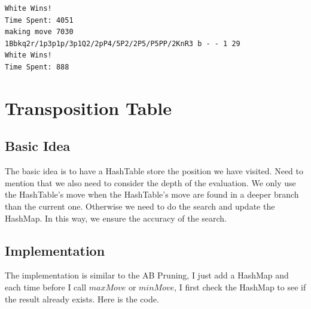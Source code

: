 \documentclass{article}
\begin{document}
\begin{lstlisting}
White Wins!
Time Spent: 4051
making move 7030
1Bbkq2r/1p3p1p/3p1Q2/2pP4/5P2/2P5/P5PP/2KnR3 b - - 1 29
White Wins!
Time Spent: 888
\end{lstlisting}

\clearpage
\section{Transposition Table}
\subsection{Basic Idea}
The basic idea is to have a HashTable store the position we have visited. Need to mention that we also need to consider the depth of the evaluation. We only use the HashTable's move when the HashTable's move are found in a deeper branch than the current one. Otherwise we need to do the search and update the HashMap. In this way, we ensure the accuracy of the search.

\subsection{Implementation}
The implementation is similar to the AB Pruning, I just add a HashMap and each time before I call $maxMove$ or $minMove$, I first check the HashMap to see if the result already exists. Here is the code.
\end{document}
